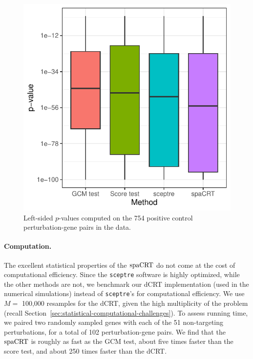 \documentclass[12pt]{article}
\theoremstyle{definition}
\newcommand{\spacrt}{\textnormal{spaCRT}}               %
\begin{document}
\begin{figure}[h!]
  \centering
  \includegraphics{figures-and-tables/power_boxplot.pdf}
\caption{Left-sided $p$-values computed on the 754 positive control perturbation-gene pairs in the \citet{Gasperini2019a} data.}
\label{fig:violinplot_scatter_power}
\end{figure}

\paragraph{Computation.}

The excellent statistical properties of the $\spacrt$ do not come at the cost of computational efficiency. Since the \verb|sceptre| software is highly optimized, while the other methods are not, we benchmark our dCRT implementation (used in the numerical simulations) instead of \verb|sceptre|'s for computational efficiency. We use $M = $ 100,000 resamples for the dCRT, given the high multiplicity of the problem (recall Section~\ref{sec:statistical-computational-challenges}). To assess running time, we paired two randomly sampled genes with each of the 51 non-targeting perturbations, for a total of 102 perturbation-gene pairs. We find that the $\spacrt$ is roughly as fast as the GCM test, about five times faster than the score test, and about 250 times faster than the dCRT.
\end{document}
